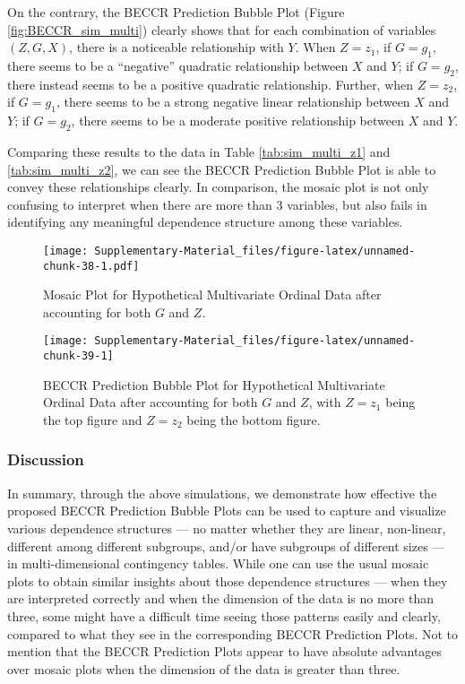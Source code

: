 \documentclass[
]{article}
\begin{document}
On the contrary, the BECCR Prediction Bubble Plot (Figure
\ref{fig:BECCR_sim_multi}) clearly shows that for each combination of
variables \((Z,G,X)\), there is a noticeable relationship with \(Y\).
When \(Z=z_1\), if \(G=g_1\), there seems to be a ``negative'' quadratic
relationship between \(X\) and \(Y\); if \(G=g_2\), there instead seems
to be a positive quadratic relationship. Further, when \(Z=z_2\), if
\(G=g_1\), there seems to be a strong negative linear relationship
between \(X\) and \(Y\); if \(G=g_2\), there seems to be a moderate
positive relationship between \(X\) and \(Y\).

Comparing these results to the data in Table \ref{tab:sim_multi_z1} and
\ref{tab:sim_multi_z2}, we can see the BECCR Prediction Bubble Plot is
able to convey these relationships clearly. In comparison, the mosaic
plot is not only confusing to interpret when there are more than 3
variables, but also fails in identifying any meaningful dependence
structure among these variables.

\begin{figure}
\centering
\texttt{[image: Supplementary-Material\_files/figure-latex/unnamed-chunk-38-1.pdf]}
\caption{\label{fig:mp_sim_multi}Mosaic Plot for Hypothetical
Multivariate Ordinal Data after accounting for both \(G\) and \(Z\).}
\end{figure}

\begin{figure}
\texttt{[image: Supplementary-Material\_files/figure-latex/unnamed-chunk-39-1]} \caption[BECCR Prediction Bubble Plot for Hypothetical Multivariate Ordinal Data after accounting for both $G$ and $Z$]{\label{fig:BECCR_sim_multi}BECCR Prediction Bubble Plot for Hypothetical Multivariate Ordinal Data after accounting for both $G$ and $Z$, with $Z=z_1$ being the top figure and $Z=z_2$ being the bottom figure.}\label{fig:unnamed-chunk-39}
\end{figure}

\subsubsection{Discussion}\label{discussion}

In summary, through the above simulations, we demonstrate how effective
the proposed BECCR Prediction Bubble Plots can be used to capture and
visualize various dependence structures --- no matter whether they are
linear, non-linear, different among different subgroups, and/or have
subgroups of different sizes --- in multi-dimensional contingency
tables. While one can use the usual mosaic plots to obtain similar
insights about those dependence structures --- when they are interpreted
correctly and when the dimension of the data is no more than three, some
might have a difficult time seeing those patterns easily and clearly,
compared to what they see in the corresponding BECCR Prediction Plots.
Not to mention that the BECCR Prediction Plots appear to have absolute
advantages over mosaic plots when the dimension of the data is greater
than three.
\end{document}
